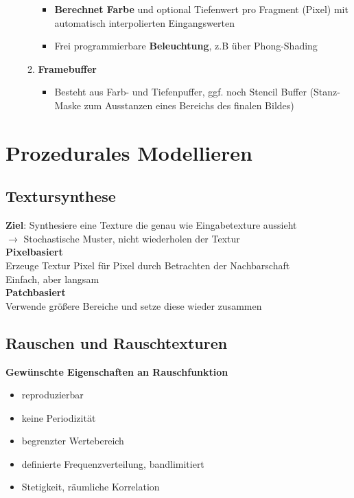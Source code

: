 \documentclass[10pt,a4paper]{article}
\begin{document}
\begin{itemize}
\begin{enumerate}
\begin{itemize}
				\item \textbf{Berechnet Farbe} und optional Tiefenwert pro Fragment (Pixel) mit automatisch interpolierten Eingangswerten
				\item Frei programmierbare \textbf{Beleuchtung}, z.B über Phong-Shading
			\end{itemize}
			\item \textbf{Framebuffer}
			\begin{itemize}
				\item Besteht aus Farb- und Tiefenpuffer, ggf. noch Stencil Buffer (Stanz-Maske zum Ausstanzen eines Bereichs des finalen Bildes)
			\end{itemize}
		\end{enumerate}
        \end{itemize}

        \newpage
        \section{Prozedurales Modellieren}
        \label{pm:sec:prozedurales_modellieren}
        
        \subsection{Textursynthese}
        \label{pm:sub:textursynthese}

        \textbf{Ziel}: Synthesiere eine Texture die genau wie Eingabetexture aussieht\\
        $\rightarrow$ Stochastische Muster, nicht wiederholen der Textur\\

        \textbf{Pixelbasiert}\\
        Erzeuge Textur Pixel für Pixel durch Betrachten der Nachbarschaft\\
        Einfach, aber langsam\\

        \textbf{Patchbasiert}\\
        Verwende größere Bereiche und setze diese wieder zusammen

        \subsection{Rauschen und Rauschtexturen}
        \label{pm:sub:rauschen_und_rauschtexturen}

        \textbf{Gewünschte Eigenschaften an Rauschfunktion}
        \begin{itemize}
        \item reproduzierbar
        \item keine Periodizität
        \item begrenzter Wertebereich
        \item definierte Frequenzverteilung, bandlimitiert
        \item Stetigkeit, räumliche Korrelation
        \end{itemize}
        
\end{document}
